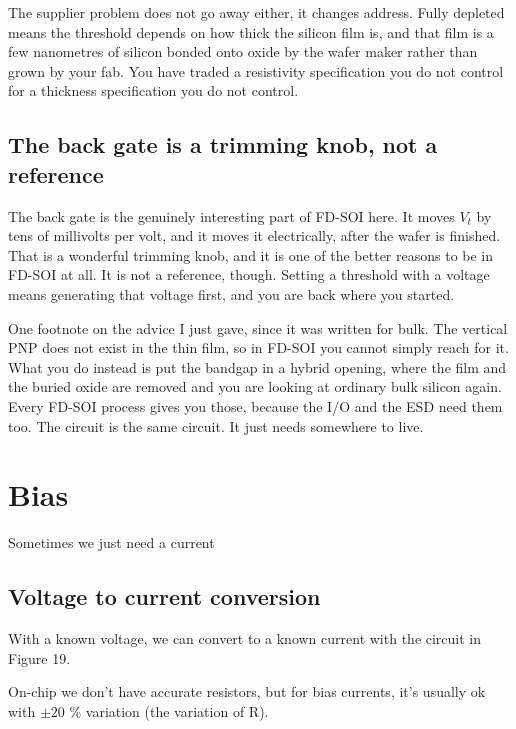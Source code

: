 The supplier problem does not go away either, it changes address. Fully
depleted means the threshold depends on how thick the silicon film is,
and that film is a few nanometres of silicon bonded onto oxide by the
wafer maker rather than grown by your fab. You have traded a resistivity
specification you do not control for a thickness specification you do
not control.

\subsection{The back gate is a trimming knob, not a
reference}\label{the-back-gate-is-a-trimming-knob-not-a-reference}

The back gate is the genuinely interesting part of FD-SOI here. It moves
\(V_t\) by tens of millivolts per volt, and it moves it electrically,
after the wafer is finished. That is a wonderful trimming knob, and it
is one of the better reasons to be in FD-SOI at all. It is not a
reference, though. Setting a threshold with a voltage means generating
that voltage first, and you are back where you started.

One footnote on the advice I just gave, since it was written for bulk.
The vertical PNP does not exist in the thin film, so in FD-SOI you
cannot simply reach for it. What you do instead is put the bandgap in a
hybrid opening, where the film and the buried oxide are removed and you
are looking at ordinary bulk silicon again. Every FD-SOI process gives
you those, because the I/O and the ESD need them too. The circuit is the
same circuit. It just needs somewhere to live.

\section{Bias}\label{bias}

\emph{} Sometimes we just need a current \emph{}

\subsection{Voltage to current
conversion}\label{voltage-to-current-conversion}

With a known voltage, we can convert to a known current with the circuit
in Figure 19.

On-chip we don't have accurate resistors, but for bias currents, it's
usually ok with \(\pm 20\) \% variation (the variation of R).

